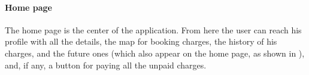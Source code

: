 \pagebreak

\paragraph{Home page} The home page is the center of the application. From here the user can reach his profile with all the details, the map for booking charges, the history of his charges, and the future ones (which also appear on the home page, as shown in ), and, if any, a button for paying all the unpaid charges.

\begin{figure}[h!]
    \begin{minipage}{0.49\textwidth}
        \centering

\end{minipage}
\end{figure}
